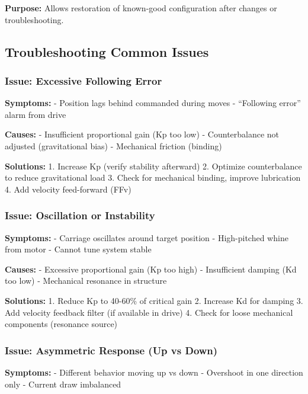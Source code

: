 \documentclass[
]{article}
\begin{document}
\textbf{Purpose:} Allows restoration of known-good configuration after
changes or troubleshooting.

\subsection{Troubleshooting Common
Issues}\label{troubleshooting-common-issues}

\subsubsection{Issue: Excessive Following
Error}\label{issue-excessive-following-error}

\textbf{Symptoms:} - Position lags behind commanded during moves -
``Following error'' alarm from drive

\textbf{Causes:} - Insufficient proportional gain (Kp too low) -
Counterbalance not adjusted (gravitational bias) - Mechanical friction
(binding)

\textbf{Solutions:} 1. Increase Kp (verify stability afterward) 2.
Optimize counterbalance to reduce gravitational load 3. Check for
mechanical binding, improve lubrication 4. Add velocity feed-forward
(FFv)

\subsubsection{Issue: Oscillation or
Instability}\label{issue-oscillation-or-instability}

\textbf{Symptoms:} - Carriage oscillates around target position -
High-pitched whine from motor - Cannot tune system stable

\textbf{Causes:} - Excessive proportional gain (Kp too high) -
Insufficient damping (Kd too low) - Mechanical resonance in structure

\textbf{Solutions:} 1. Reduce Kp to 40-60\% of critical gain 2. Increase
Kd for damping 3. Add velocity feedback filter (if available in drive)
4. Check for loose mechanical components (resonance source)

\subsubsection{Issue: Asymmetric Response (Up vs
Down)}\label{issue-asymmetric-response-up-vs-down}

\textbf{Symptoms:} - Different behavior moving up vs down - Overshoot in
one direction only - Current draw imbalanced
\end{document}
